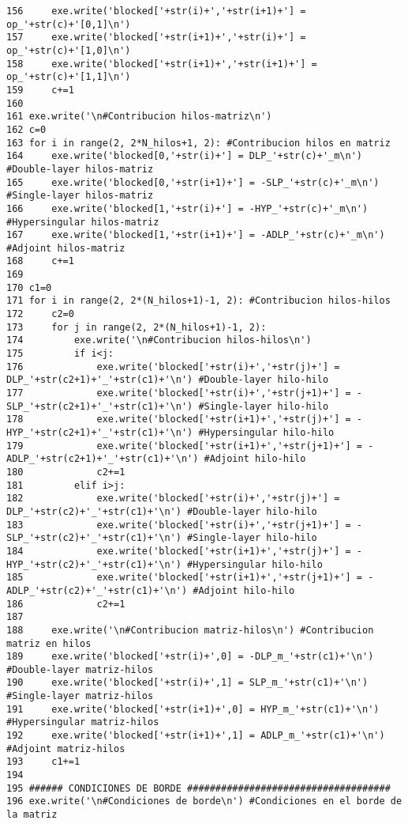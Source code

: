 \documentclass[12pt,letterpaper]{article}
\numberwithin{equation}{section}
\begin{document}
\begin{lstlisting}
156     exe.write('blocked['+str(i)+','+str(i+1)+'] = op_'+str(c)+'[0,1]\n')
157     exe.write('blocked['+str(i+1)+','+str(i)+'] = op_'+str(c)+'[1,0]\n')
158     exe.write('blocked['+str(i+1)+','+str(i+1)+'] = op_'+str(c)+'[1,1]\n')
159     c+=1
160 
161 exe.write('\n#Contribucion hilos-matriz\n')
162 c=0
163 for i in range(2, 2*N_hilos+1, 2): #Contribucion hilos en matriz
164     exe.write('blocked[0,'+str(i)+'] = DLP_'+str(c)+'_m\n') #Double-layer hilos-matriz 
165     exe.write('blocked[0,'+str(i+1)+'] = -SLP_'+str(c)+'_m\n') #Single-layer hilos-matriz
166     exe.write('blocked[1,'+str(i)+'] = -HYP_'+str(c)+'_m\n') #Hypersingular hilos-matriz
167     exe.write('blocked[1,'+str(i+1)+'] = -ADLP_'+str(c)+'_m\n') #Adjoint hilos-matriz
168     c+=1
169 
170 c1=0
171 for i in range(2, 2*(N_hilos+1)-1, 2): #Contribucion hilos-hilos
172     c2=0
173     for j in range(2, 2*(N_hilos+1)-1, 2):
174         exe.write('\n#Contribucion hilos-hilos\n')
175         if i<j:
176             exe.write('blocked['+str(i)+','+str(j)+'] = DLP_'+str(c2+1)+'_'+str(c1)+'\n') #Double-layer hilo-hilo
177             exe.write('blocked['+str(i)+','+str(j+1)+'] = -SLP_'+str(c2+1)+'_'+str(c1)+'\n') #Single-layer hilo-hilo
178             exe.write('blocked['+str(i+1)+','+str(j)+'] = -HYP_'+str(c2+1)+'_'+str(c1)+'\n') #Hypersingular hilo-hilo
179             exe.write('blocked['+str(i+1)+','+str(j+1)+'] = -ADLP_'+str(c2+1)+'_'+str(c1)+'\n') #Adjoint hilo-hilo
180             c2+=1
181         elif i>j:
182             exe.write('blocked['+str(i)+','+str(j)+'] = DLP_'+str(c2)+'_'+str(c1)+'\n') #Double-layer hilo-hilo
183             exe.write('blocked['+str(i)+','+str(j+1)+'] = -SLP_'+str(c2)+'_'+str(c1)+'\n') #Single-layer hilo-hilo
184             exe.write('blocked['+str(i+1)+','+str(j)+'] = -HYP_'+str(c2)+'_'+str(c1)+'\n') #Hypersingular hilo-hilo
185             exe.write('blocked['+str(i+1)+','+str(j+1)+'] = -ADLP_'+str(c2)+'_'+str(c1)+'\n') #Adjoint hilo-hilo
186             c2+=1
187 
188     exe.write('\n#Contribucion matriz-hilos\n') #Contribucion matriz en hilos
189     exe.write('blocked['+str(i)+',0] = -DLP_m_'+str(c1)+'\n') #Double-layer matriz-hilos
190     exe.write('blocked['+str(i)+',1] = SLP_m_'+str(c1)+'\n') #Single-layer matriz-hilos
191     exe.write('blocked['+str(i+1)+',0] = HYP_m_'+str(c1)+'\n') #Hypersingular matriz-hilos 
192     exe.write('blocked['+str(i+1)+',1] = ADLP_m_'+str(c1)+'\n') #Adjoint matriz-hilos
193     c1+=1
194 
195 ###### CONDICIONES DE BORDE ####################################
196 exe.write('\n#Condiciones de borde\n') #Condiciones en el borde de la matriz

\end{lstlisting}
\end{document}
